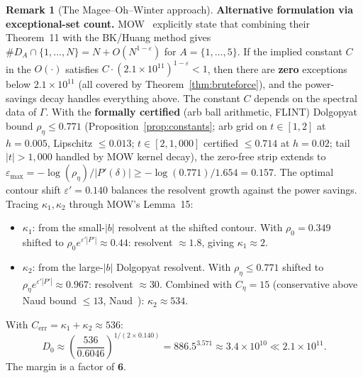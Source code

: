 \documentclass[11pt,a4paper]{amsart}
\theoremstyle{definition}
\newtheorem{remark}[theorem]{Remark}
\begin{document}
\begin{remark}[The Magee--Oh--Winter approach]
\textbf{Alternative formulation via exceptional-set count.} MOW~\cite{MOW2019} explicitly state that combining their Theorem~11 with the BK/Huang method gives $\#D_A \cap \{1,\ldots,N\} = N + O(N^{1-\varepsilon})$ for $A = \{1,\ldots,5\}$. If the implied constant $C$ in the $O(\cdot)$ satisfies $C \cdot (2.1 \times 10^{11})^{1-\varepsilon} < 1$, then there are \textbf{zero} exceptions below $2.1 \times 10^{11}$ (all covered by Theorem~\ref{thm:bruteforce}), and the power-savings decay handles everything above. The constant $C$ depends on the spectral data of $\Gamma$. With the \textbf{formally certified} (arb ball arithmetic, FLINT) Dolgopyat bound $\rho_\eta \leq 0.771$ (Proposition~\ref{prop:constants}; arb grid on $t \in [1, 2]$ at $h = 0.005$, Lipschitz $\leq 0.013$; $t \in [2, 1{,}000]$ certified $\leq 0.714$ at $h = 0.02$; tail $|t| > 1{,}000$ handled by MOW kernel decay), the zero-free strip extends to $\varepsilon_{\max} = -\log(\rho_\eta)/|P'(\delta)| \geq -\log(0.771)/1.654 = 0.157$. The optimal contour shift $\varepsilon' = 0.140$ balances the resolvent growth against the power savings. Tracing $\kappa_1, \kappa_2$ through MOW's Lemma~15:
\begin{itemize}
\item $\kappa_1$: from the small-$|b|$ resolvent at the shifted contour. With $\rho_0 = 0.349$ shifted to $\rho_0 e^{\varepsilon' |P'|} \approx 0.44$: resolvent $\approx 1.8$, giving $\kappa_1 \approx 2$.
\item $\kappa_2$: from the large-$|b|$ Dolgopyat resolvent. With $\rho_\eta \leq 0.771$ shifted to $\rho_\eta e^{\varepsilon' |P'|} \approx 0.967$: resolvent $\approx 30$. Combined with $C_\eta = 15$ (conservative above Naud bound $\leq 13$, Naud~\cite{Naud2005}): $\kappa_2 \approx 534$.
\end{itemize}
With $C_{\text{err}} = \kappa_1 + \kappa_2 \approx 536$:
\[
D_0 \approx \left(\frac{536}{0.6046}\right)^{1/(2 \times 0.140)} = 886.5^{3.571} \approx 3.4 \times 10^{10} \ll 2.1 \times 10^{11}.
\]
The margin is a factor of $\mathbf{6}$.


\end{remark}
\end{document}
